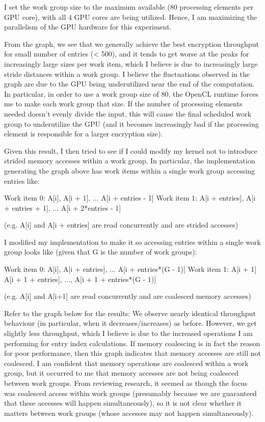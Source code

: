 \documentclass[conference,10pt]{IEEEtran}
\begin{document}
I set the work group size to the maximum available (80 processing elements per GPU core), with all 4 
GPU cores are being utilized.  Hence, I am maximizing the parallelism of the GPU hardware for this 
experiment.

From the graph, we see that we generally achieve the best encryption throughput for small number of 
entries (< 500), and it tends to get worse at the peaks for increasingly large sizes per work item, 
which I believe is due to increasingly large stride distances within a work group. I believe the 
fluctuations observed in the graph are due to the GPU being underutilized near the end of the 
computation.  In particular, in order to use a work group size of 80, the OpenCL runtime forces me 
to make each work group that size.  If the number of processing elements needed doesn't evenly 
divide the input, this will cause the final scheduled work group to underutilize the GPU (and it 
becomes increasingly bad if the processing element is responsible for a larger encryption size).

Given this result, I then tried to see if I could modify my kernel not to introduce strided memory 
accesses within a work group.  In particular, the implementation generating the graph above has work 
items within a single work group accessing entries like:

Work item 0: A[i], A[i + 1], ... A[i + entries - 1]
Work item 1: A[i + entries], A[i + entries + 1], ... A[i + 2*entries - 1]

(e.g. A[i] and A[i + entries] are read concurrently and are strided accesses)

I modified my implementation to make it so accessing entries within a single work group looks like 
(given that G is the number of work groups):

Work item 0: A[i], A[i + entries], ... A[i + entries*(G - 1)]
Work item 1: A[i + 1] A[i + 1 + entries], ..., A[i + 1 + entries*(G - 1)]

(e.g. A[i] and A[i+1] are read concurrently and are coalesced memory accesses)

Refer to the graph below for the results:
We observe nearly identical throughput behaviour (in particular, when it decreases/increases) as 
before.  However, we get slightly less throughput, which I believe is due to the increased 
operations I am performing for entry index calculations.  If memory coalescing is in fact the reason 
for poor performance, then this graph indicates that memory accesses are still not coalesced.  I am 
confident that memory operations are coalesced within a work group, but it occurred to me that 
memory accesses are not being coalesced between work groups.  From reviewing research, it seemed as 
though the focus was coalesced access within work groups (presumably because we are guaranteed that 
these accesses will happen simultaneously), so it is not clear whether it matters between work 
groups (whose accesses may not happen simultaneously).
\end{document}
